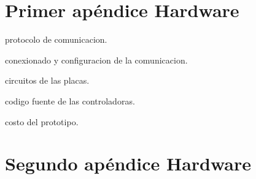 
\section{Primer ap\'endice Hardware}

protocolo de comunicacion.
\label{HAppProtocolo}

conexionado y configuracion de la comunicacion.

circuitos de las placas.

codigo fuente de las controladoras.

costo del prototipo.

\section{Segundo ap\'endice Hardware}

